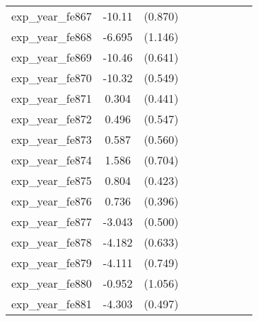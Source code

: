 {\begin{tabular}{l*{4}{cc}}
exp\_year\_fe867&   -10.11\sym{***}&  (0.870)&                  &         &                  &         &                  &         \\
exp\_year\_fe868&   -6.695\sym{***}&  (1.146)&                  &         &                  &         &                  &         \\
exp\_year\_fe869&   -10.46\sym{***}&  (0.641)&                  &         &                  &         &                  &         \\
exp\_year\_fe870&   -10.32\sym{***}&  (0.549)&                  &         &                  &         &                  &         \\
exp\_year\_fe871&    0.304         &  (0.441)&                  &         &                  &         &                  &         \\
exp\_year\_fe872&    0.496         &  (0.547)&                  &         &                  &         &                  &         \\
exp\_year\_fe873&    0.587         &  (0.560)&                  &         &                  &         &                  &         \\
exp\_year\_fe874&    1.586\sym{*}  &  (0.704)&                  &         &                  &         &                  &         \\
exp\_year\_fe875&    0.804         &  (0.423)&                  &         &                  &         &                  &         \\
exp\_year\_fe876&    0.736         &  (0.396)&                  &         &                  &         &                  &         \\
exp\_year\_fe877&   -3.043\sym{***}&  (0.500)&                  &         &                  &         &                  &         \\
exp\_year\_fe878&   -4.182\sym{***}&  (0.633)&                  &         &                  &         &                  &         \\
exp\_year\_fe879&   -4.111\sym{***}&  (0.749)&                  &         &                  &         &                  &         \\
exp\_year\_fe880&   -0.952         &  (1.056)&                  &         &                  &         &                  &         \\
exp\_year\_fe881&   -4.303\sym{***}&  (0.497)&                  &         &                  &         &                  &         \\

\end{tabular}}
